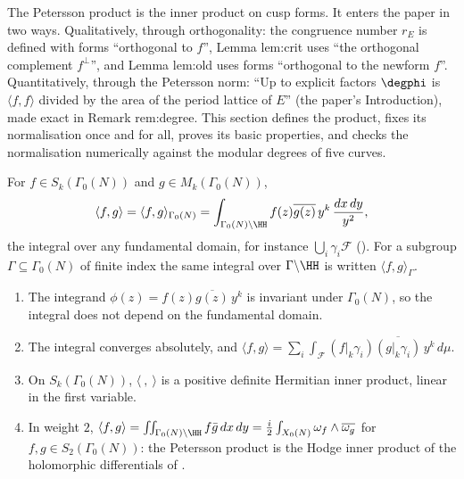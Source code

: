 The Petersson product is the inner product on cusp forms. It enters the paper in two ways. Qualitatively, through orthogonality: the congruence number $r_E$ is
defined with forms ``orthogonal to $f$'', Lemma lem:crit uses ``the orthogonal complement $f^\perp$'', and Lemma lem:old uses forms ``orthogonal to the newform $f$''.
Quantitatively, through the Petersson norm: ``Up to explicit factors $\degphi$ is $\langle f,f\rangle$ divided by the area of the period lattice of $E$'' (the paper's
Introduction), made exact in Remark rem:degree. This section defines the product, fixes its normalisation once and for all, proves its basic properties, and checks the
normalisation numerically against the modular degrees of five curves.

\begin{definition}\label{def:modforms:petersson}
For $f\in S_k(\Gamma_0(N))$ and $g\in M_k(\Gamma_0(N))$,
\[
\langle f,g\rangle=\langle f,g\rangle_{\Gamma_0(N)}=\int_{\Gamma_0(N)\backslash\HH}f(z)\overline{g(z)}\,y^k\,\frac{dx\,dy}{y^2},
\]
the integral over any fundamental domain, for instance $\bigcup_i\gamma_i\mathcal F$ (). For a subgroup $\Gamma\subseteq\Gamma_0(N)$ of finite index the
same integral over $\Gamma\backslash\HH$ is written $\langle f,g\rangle_\Gamma$.
\end{definition}

\begin{proposition}\label{prop:modforms:petersson}
\begin{enumerate}[label=(\roman*)]
\item The integrand $\phi(z)=f(z)\overline{g(z)}\,y^k$ is invariant under $\Gamma_0(N)$, so the integral does not depend on the fundamental domain.
\item The integral converges absolutely, and $\langle f,g\rangle=\sum_i\int_{\mathcal F}(f|_k\gamma_i)\overline{(g|_k\gamma_i)}\,y^k\,d\mu$.
\item On $S_k(\Gamma_0(N))$, $\langle\ ,\ \rangle$ is a positive definite Hermitian inner product, linear in the first variable.
\item In weight $2$, $\langle f,g\rangle=\iint_{\Gamma_0(N)\backslash\HH}f\bar g\,dx\,dy=\frac i2\int_{X_0(N)}\omega_f\wedge\overline{\omega_g}$ for $f,g\in S_2(\Gamma_0(N))$: the Petersson product is the Hodge inner
product of the holomorphic differentials of .
\end{enumerate}
\end{proposition}

